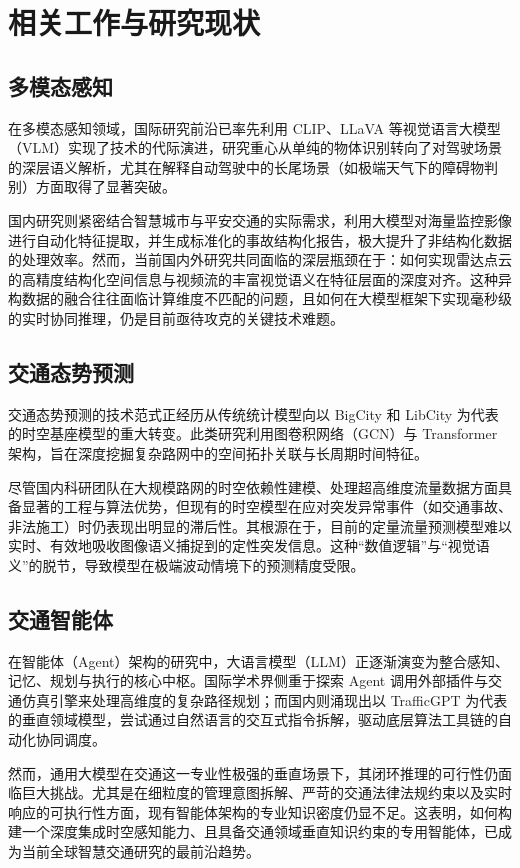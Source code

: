 \chapter{相关工作与研究现状}

\section{多模态感知}

在多模态感知领域，国际研究前沿已率先利用 CLIP、LLaVA 等视觉语言大模型（VLM）实现了技术的代际演进，研究重心从单纯的物体识别转向了对驾驶场景的深层语义解析，尤其在解释自动驾驶中的长尾场景（如极端天气下的障碍物判别）方面取得了显著突破。

国内研究则紧密结合智慧城市与平安交通的实际需求，利用大模型对海量监控影像进行自动化特征提取，并生成标准化的事故结构化报告，极大提升了非结构化数据的处理效率\cite{liu2022multi}。然而，当前国内外研究共同面临的深层瓶颈在于：如何实现雷达点云的高精度结构化空间信息与视频流的丰富视觉语义在特征层面的深度对齐。这种异构数据的融合往往面临计算维度不匹配的问题，且如何在大模型框架下实现毫秒级的实时协同推理，仍是目前亟待攻克的关键技术难题。

\section{交通态势预测}

交通态势预测的技术范式正经历从传统统计模型向以 BigCity\cite{lan2024bigcity} 和 LibCity\cite{wang2021libcity} 为代表的时空基座模型的重大转变。此类研究利用图卷积网络（GCN）与 Transformer 架构，旨在深度挖掘复杂路网中的空间拓扑关联与长周期时间特征。

尽管国内科研团队在大规模路网的时空依赖性建模、处理超高维度流量数据方面具备显著的工程与算法优势，但现有的时空模型在应对突发异常事件（如交通事故、非法施工）时仍表现出明显的滞后性。其根源在于，目前的定量流量预测模型难以实时、有效地吸收图像语义捕捉到的定性突发信息。这种“数值逻辑”与“视觉语义”的脱节，导致模型在极端波动情境下的预测精度受限\cite{zhang2021citynet}。

\section{交通智能体}

在智能体（Agent）架构的研究中，大语言模型（LLM）正逐渐演变为整合感知、记忆、规划与执行的核心中枢\cite{xi2023rise}。国际学术界侧重于探索 Agent 调用外部插件与交通仿真引擎来处理高维度的复杂路径规划；而国内则涌现出以 TrafficGPT\cite{zheng2023trafficgpt} 为代表的垂直领域模型，尝试通过自然语言的交互式指令拆解，驱动底层算法工具链的自动化协同调度。

然而，通用大模型在交通这一专业性极强的垂直场景下，其闭环推理的可行性仍面临巨大挑战。尤其是在细粒度的管理意图拆解、严苛的交通法律法规约束以及实时响应的可执行性方面，现有智能体架构的专业知识密度仍显不足。这表明，如何构建一个深度集成时空感知能力、且具备交通领域垂直知识约束的专用智能体，已成为当前全球智慧交通研究的最前沿趋势。
